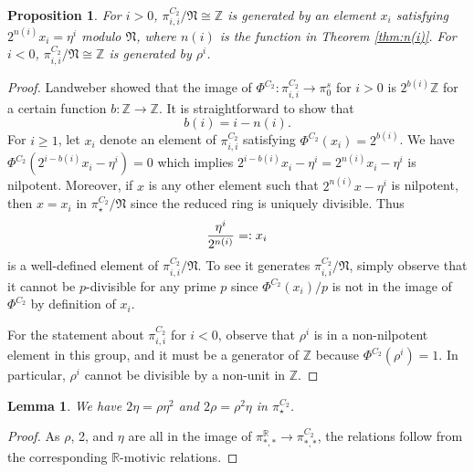 \documentclass[psamsfonts]{amsart}
\newcommand{\Z}{\mathbb Z}
\newcommand{\fN}{\mathfrak N}
\newtheorem{proposition}[theorem]{Proposition}
\newtheorem{lemma}[theorem]{Lemma}
\theoremstyle{definition}
\theoremstyle{remark}
\newcommand{\R}{\mathbb{R}}
\numberwithin{equation}{section}
\begin{document}
\begin{proposition}\label{prop:2div}
For $i>0$, $\pi_{i,i}^{C_2}/\fN\cong \Z$ is generated by an element $x_i$ satisfying
$2^{n(i)}x_i = \eta^i$ modulo $\fN$, where $n(i)$ is the function in Theorem \ref{thm:n(i)}.
For $i < 0$, $\pi_{i,i}^{C_2}/\fN\cong \Z$ is generated by $\rho^i$.
\end{proposition}
\begin{proof}
Landweber \cite{L} showed that the image of $\Phi^{C_2}:\pi_{i,i}^{C_2}\to \pi_0^s$ for
$i>0$ is $2^{b(i)}\Z$ for a certain function $b:\Z\to \Z$. It is straightforward
to show that 
$$ b(i) = i-n(i). $$
For $i\geq 1$, let $x_i$
denote an element of $\pi_{i,i}^{C_2}$ satisfying $\Phi^{C_2}(x_i) = 2^{b(i)}$.
We have $\Phi^{C_2}(2^{i-b(i)}x_i - \eta^i) = 0$ which implies $2^{i-b(i)}x_i -
\eta^i = 2^{n(i)}x_i - \eta^i$ is nilpotent. Moreover, if $x$ is any other
element such that $2^{n(i)}x -\eta^i$ is nilpotent, then $x = x_i$ in
$\pi_\star^{C_2}/\fN$ since the reduced ring is uniquely divisible. Thus
$$ {\eta^i\over 2^{n(i)}} =: x_i $$
is a well-defined element of $\pi_{i,i}^{C_2}/\fN$.
To see it generates $\pi_{i,i}^{C_2}/\fN$, simply observe that it cannot be
$p$-divisible for any prime $p$ since $\Phi^{C_2}(x_i)/p$ is not in the image of
$\Phi^{C_2}$ by definition of $x_i$.

For the statement about $\pi_{i,i}^{C_2}$ for $i < 0$, observe that $\rho^i$ is
in a non-nilpotent element in this group, and it must be a generator of $\Z$
because $\Phi^{C_2}(\rho^i)=1$. In particular, $\rho^i$ cannot be divisible by
a non-unit in $\Z$.
\end{proof}

\begin{lemma}\label{lem:2eta}
We have $2\eta = \rho \eta^2$ and $2\rho = \rho^2 \eta$ in $\pi_\star^{C_2}$.
\end{lemma}
\begin{proof}
As $\rho$, 2, and $\eta$ are all in the image of $\pi_{*,*}^\R\to
\pi_{*,*}^{C_2}$, the relations follow from the corresponding $\R$-motivic
relations.
\end{proof}
\end{document}
